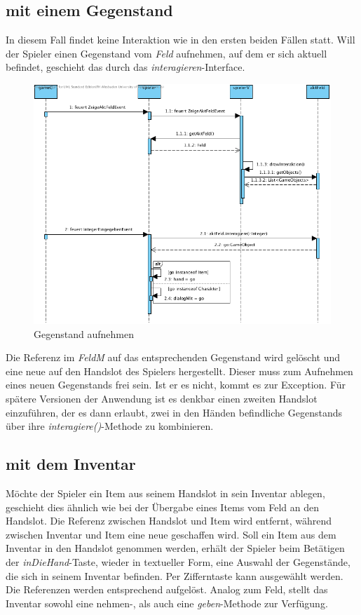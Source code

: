 \subsection{mit einem Gegenstand}
In diesem Fall findet keine Interaktion wie in den ersten beiden Fällen statt. Will der \gls{Spieler} einen 
\gls{Gegenstand} vom \textit{Feld} aufnehmen, auf dem er sich aktuell befindet, geschieht das durch das \textit{interagieren}-Interface.

\begin{figure}[h]
	\begin{center}
		\includegraphics[trim=0cm 0cm 0cm 0cm, clip=true, width=13cm]{kapitel/laufzeitsicht/itemAufnehmen.png}
	\end{center}
	\caption{Gegenstand aufnehmen}
	\label{fig:item_uml}
\end{figure}

Die Referenz im \textit{FeldM} auf das entsprechenden \gls{Gegenstand} wird gelöscht
und eine neue auf den Handslot des \gls{Spieler}s hergestellt. Dieser muss zum Aufnehmen eines neuen \gls{Gegenstand}s 
frei sein. Ist er es nicht, kommt es zur Exception. 
Für spätere Versionen der Anwendung ist es denkbar einen zweiten Handslot einzuführen, der es dann
erlaubt, zwei in den Händen befindliche \glspl{Gegenstand} über ihre \textit{interagiere()}-Methode zu kombinieren.

\subsection{mit dem Inventar}
Möchte der Spieler ein Item aus seinem Handslot in sein Inventar ablegen, geschieht dies ähnlich wie
bei der Übergabe eines Items vom Feld an den Handslot. Die Referenz zwischen Handslot und Item wird 
entfernt, während zwischen Inventar und Item eine neue geschaffen wird.
Soll ein Item aus dem Inventar in den Handslot genommen werden, erhält der Spieler beim Betätigen 
der \textit{inDieHand}-Taste, wieder in textueller Form, eine Auswahl der Gegenstände, die sich in seinem 
Inventar befinden. Per Zifferntaste kann ausgewählt werden. Die Referenzen werden entsprechend 
aufgelöst. Analog zum Feld, stellt das Inventar sowohl eine nehmen-, als auch eine \textit{geben}-Methode 
zur Verfügung.


